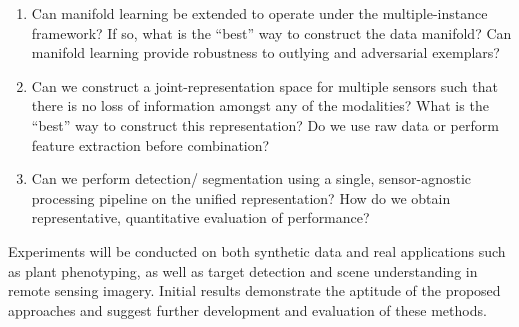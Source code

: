 \begin{enumerate}
	\item Can manifold learning be extended to operate under the multiple-instance framework? If so, what is the ``best'' way to construct the data manifold?  Can manifold learning provide robustness to outlying and adversarial exemplars?
	\item Can we construct a joint-representation space for multiple sensors such that there is no loss of information amongst any of the modalities?  What is the ``best'' way to construct this representation?  Do we use raw data or perform feature extraction before combination?
	\item Can we perform detection/ segmentation using a single, sensor-agnostic processing pipeline on the unified representation?  How do we obtain representative, quantitative evaluation of performance?
\end{enumerate} 

Experiments will be conducted on both synthetic data and real applications such as plant phenotyping, as well as target detection and scene understanding in remote sensing imagery. Initial results demonstrate the aptitude of the proposed approaches and suggest further development and evaluation of these methods.


